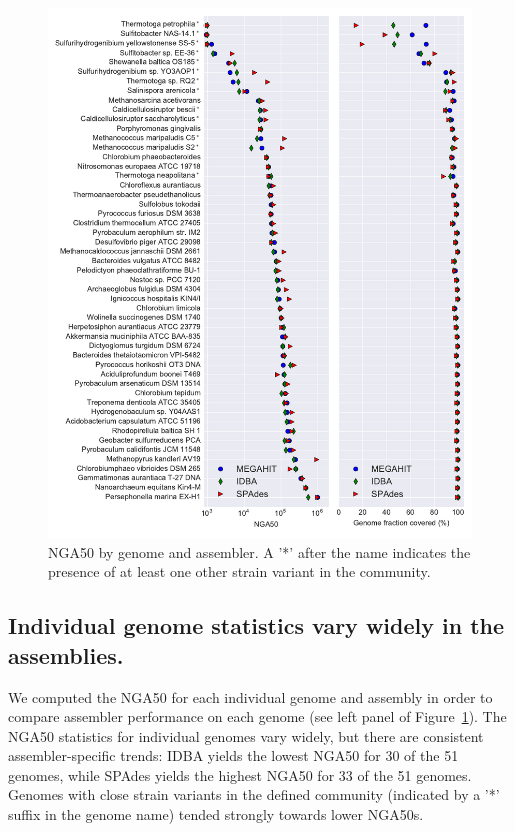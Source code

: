 \documentclass[11pt]{article}
\begin{document}
\newpage

\begin{figure}[!h]
\centering
\includegraphics[width=\textwidth]{combined.pdf}  
\caption{NGA50 by genome and assembler. A '*' after the name indicates the presence of at least one other strain variant in the community.}
\label{fig:nga50}
\end{figure}

\newpage

\subsection*{Individual genome statistics vary widely in the assemblies.}

We computed the NGA50 for each individual genome and assembly in order
to compare assembler performance on each genome (see left panel of
Figure~\ref{fig:nga50}).  The NGA50 statistics for individual genomes
vary widely, but there are consistent assembler-specific trends: IDBA
yields the lowest NGA50 for 30 of the 51 genomes, while SPAdes yields
the highest NGA50 for 33 of the 51 genomes.  Genomes with close strain
variants in the defined community (indicated by a '*' suffix in the
genome name) tended strongly towards lower NGA50s.
\end{document}
